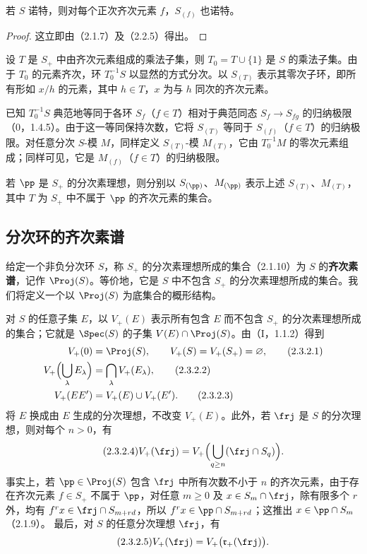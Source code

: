 若 $S$ 诺特，则对每个正次齐次元素 $f$，$S_{(f)}$ 也诺特。
\begin{proof}
这立即由（2.1.7）及（2.2.5）得出。
\end{proof}

设 $T$ 是 $S_+$ 中由齐次元素组成的乘法子集，则 $T_0=T\cup\{1\}$ 是 $S$ 的乘法子集。由于 $T_0$ 的元素齐次，环 $T_0^{-1}S$ 以显然的方式分次。以 $S_{(T)}$ 表示其零次子环，即所有形如 $x/h$ 的元素，其中 $h\in T$，$x$ 为与 $h$ 同次的齐次元素。

已知 $T_0^{-1}S$ 典范地等同于各环 $S_f$（$f\in T$）相对于典范同态 $S_f\to S_{fg}$ 的归纳极限（0，1.4.5）。由于这一等同保持次数，它将 $S_{(T)}$ 等同于 $S_{(f)}$（$f\in T$）的归纳极限。对任意分次 $S$-模 $M$，同样定义 $S_{(T)}$-模 $M_{(T)}$，它由 $T_0^{-1}M$ 的零次元素组成；同样可见，它是 $M_{(f)}$（$f\in T$）的归纳极限。

若 $\pp$ 是 $S_+$ 的分次素理想，则分别以 $S_{(\pp)}$、$M_{(\pp)}$ 表示上述 $S_{(T)}$、$M_{(T)}$，其中 $T$ 为 $S_+$ 中不属于 $\pp$ 的齐次元素的集合。

\subsection{分次环的齐次素谱}
给定一个非负分次环 $S$，称 $S_+$ 的分次素理想所成的集合（2.1.10）为 $S$ 的\textbf{齐次素谱}，记作 $\Proj(S)$。等价地，它是 $S$ 中不包含 $S_+$ 的分次素理想所成的集合。我们将定义一个以 $\Proj(S)$ 为底集合的概形结构。

对 $S$ 的任意子集 $E$，以 $V_+(E)$ 表示所有包含 $E$ 而不包含 $S_+$ 的分次素理想所成的集合；它就是 $\Spec(S)$ 的子集 $V(E)\cap\Proj(S)$。由（I，1.1.2）得到
\begin{align}
V_+(0)&=\Proj(S),\qquad V_+(S)=V_+(S_+)=\varnothing,\tag{2.3.2.1}\\
V_+\Bigl(\bigcup_\lambda E_\lambda\Bigr)&=\bigcap_\lambda V_+(E_\lambda),\tag{2.3.2.2}\\
V_+(EE')&=V_+(E)\cup V_+(E').\tag{2.3.2.3}
\end{align}
将 $E$ 换成由 $E$ 生成的分次理想，不改变 $V_+(E)$。此外，若 $\frj$ 是 $S$ 的分次理想，则对每个 $n>0$，有
\begin{equation}\tag{2.3.2.4}
V_+(\frj)=V_+\Bigl(\bigcup_{q\geq n}(\frj\cap S_q)\Bigr).
\end{equation}
事实上，若 $\pp\in\Proj(S)$ 包含 $\frj$ 中所有次数不小于 $n$ 的齐次元素，由于存在齐次元素 $f\in S_+$ 不属于 $\pp$，对任意 $m\geq0$ 及 $x\in S_m\cap\frj$，除有限多个 $r$ 外，均有
$f^rx\in\frj\cap S_{m+rd}$，所以 $f^rx\in\pp\cap S_{m+rd}$；这推出 $x\in\pp\cap S_m$（2.1.9）。
最后，对 $S$ 的任意分次理想 $\frj$，有
\begin{equation}\tag{2.3.2.5}
V_+(\frj)=V_+\bigl(\mathfrak r_+(\frj)\bigr).
\end{equation}

